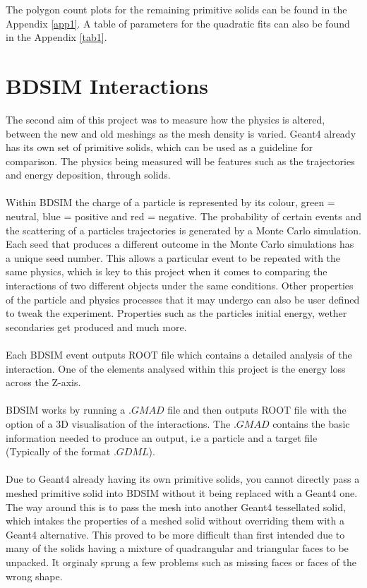 \documentclass[12pt,a4paper]{article}
\begin{document}
\noindent The polygon count plots for the remaining primitive solids can be found in the Appendix \ref{app1}. A table of parameters for the quadratic fits can also be found in the Appendix \ref{tab1}. 

\newpage
\section{BDSIM Interactions}
\label{int}
The second aim of this project was to measure how the physics is altered, between the new and old meshings as the mesh density is varied. Geant4 already has its own set of primitive solids, which can be used as a guideline for comparison. The physics being measured will be features such as the trajectories and energy deposition, through solids.
\\\\
Within BDSIM the charge of a particle is represented by its colour, green = neutral, blue = positive and red = negative. The probability of certain events and the scattering of a particles trajectories is generated by a Monte Carlo simulation. Each seed that produces a different outcome in the Monte Carlo simulations has a unique seed number. This allows a particular event to be repeated with the same physics, which is key to this project when it comes to comparing the interactions of two different objects under the same conditions. Other properties of the particle and physics processes that it may undergo can also be user defined to tweak the experiment. Properties such as the particles initial energy, wether secondaries get produced and much more.
\\\\
Each BDSIM event outputs ROOT file which contains a detailed analysis of the interaction. One of the elements analysed within this project is the energy loss across the Z-axis.
\\\\
BDSIM works by running a $.GMAD$ file and then outputs ROOT file with the option of a 3D visualisation of the interactions. The $.GMAD$ contains the basic information needed to produce an output, i.e a particle and a target file (Typically of the format $.GDML$).
\\\\
Due to Geant4 already having its own primitive solids, you cannot directly pass a meshed primitive solid into BDSIM without it being replaced with a Geant4 one. The way around this is to pass the mesh into another Geant4 tessellated solid, which intakes the properties of a meshed solid without overriding them with a Geant4 alternative. This proved to be more difficult than first intended due to many of the solids having a mixture of quadrangular and triangular faces to be unpacked. It orginaly sprung a few problems such as missing faces or faces of the wrong shape. 
\end{document}
